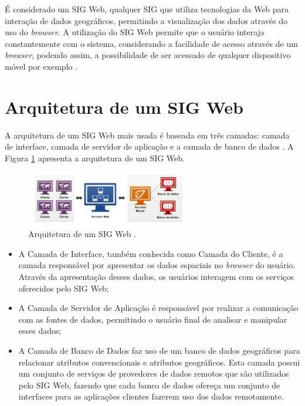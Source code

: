 É considerado um SIG Web, qualquer SIG que utiliza tecnologias da Web para interação de dados geográficos, permitindo a visualização dos dados através do uso do \textit{browser}. A utilização do SIG Web permite que o usuário interaja constantemente com o sistema, considerando a facilidade de acesso através de um \textit{browser}, podendo assim, a possibilidade de ser acessado de qualquer dispositivo móvel por exemplo \cite{webgis}.

\newpage

\section{Arquitetura de um SIG Web}

A arquitetura de um SIG Web mais usada é baseada em três camadas: camada de interface, camada de servidor de aplicação e a camada de banco de dados \cite{webgisfuture}. A Figura \ref{fig:ArquiteturaSIGWeb} apresenta a arquitetura de um SIG Web.

\begin{figure}[h]
\centering
\includegraphics[width=0.65\textwidth]{./img/cap_III/4-ArquiteturaSIGWeb}
\caption{Arquitetura de um SIG Web \cite{websisbra}.}
\label{fig:ArquiteturaSIGWeb}
\end{figure}

\begin{itemize}
\item A Camada de Interface, também conhecida como Camada do Cliente, é a camada responsável por apresentar os dados espaciais no \textit{browser} do usuário. Através da apresentação desses dados, os usuários interagem com os serviços oferecidos pelo SIG Web;
\item A Camada de Servidor de Aplicação é responsável por realizar a comunicação  com as fontes de dados, permitindo o usuário final de analisar e manipular esses dados;
\item A Camada de Banco de Dados faz uso de um banco de dados geográficos para relacionar atributos convencionais e atributos geográficos. Esta camada possui um conjunto de serviços de provedores de dados remotos que são utilizados pelo SIG Web, fazendo que cada banco de dados ofereça um conjunto de interfaces para as aplicações clientes fazerem uso dos dados remotamente.
\end{itemize}

